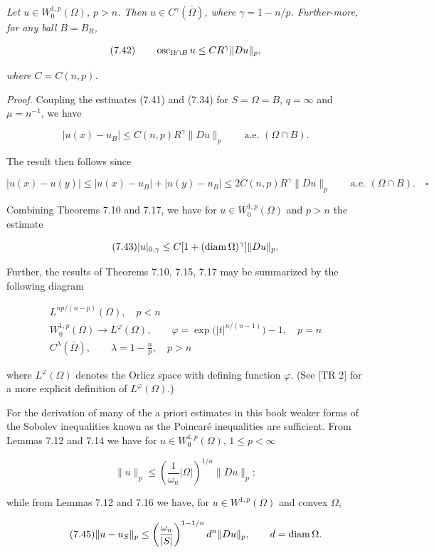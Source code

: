 \begin{theorem}\label{gt:thm-sobolev-morrey}
\emph{Let $u\in W^{1,p}_0(\Omega)$, $p>n$. Then $u\in C^\gamma(\overline{\Omega})$, where $\gamma=1-n/p$. Further-more, for any ball $B=B_R$,}

\[
(7.42)\qquad \operatorname{osc}_{\Omega\cap B} u \le CR^\gamma \|Du\|_p,
\]

\emph{where $C=C(n,p)$.}

\textit{Proof.} Coupling the estimates (7.41) and (7.34) for $S=\Omega=B$, $q=\infty$ and $\mu=n^{-1}$, we have

\[
|u(x)-u_B|\le C(n,p)R^\gamma \|Du\|_p \qquad \text{a.e. }(\Omega\cap B).
\]

The result then follows since

\[
|u(x)-u(y)|\le |u(x)-u_B|+|u(y)-u_B|
\le 2C(n,p)R^\gamma \|Du\|_p \qquad \text{a.e. }(\Omega\cap B). \quad \square
\]



Combining Theorems 7.10 and 7.17, we have for $u\in W_0^{1,p}(\Omega)$ and $p>n$ the estimate

\begin{equation}
\tag{7.43}
|u|_{0,\gamma}\le C[1+(\operatorname{diam} \Omega)^\gamma]\|Du\|_p.
\end{equation}

Further, the results of Theorems 7.10, 7.15, 7.17 may be summarized by the following diagram

\[
\begin{array}{c}
L^{np/(n-p)}(\Omega), \quad p<n \\[1.5ex]
W_0^{1,p}(\Omega)\to L^{\varphi}(\Omega), \qquad \varphi=\exp\!\bigl(|t|^{n/(n-1)}\bigr)-1,\quad p=n \\[1.5ex]
C^{\lambda}(\bar{\Omega}), \qquad \lambda=1-\frac{n}{p},\quad p>n
\end{array}
\]

where $L^{\varphi}(\Omega)$ denotes the Orlicz space with defining function $\varphi$. (See [TR 2] for a more explicit definition of $L^{\varphi}(\Omega)$.)

For the derivation of many of the a priori estimates in this book weaker forms of the Sobolev inequalities known as the Poincar\'e inequalities are sufficient. From Lemmas 7.12 and 7.14 we have for $u\in W_0^{1,p}(\Omega)$, $1\le p<\infty$

\begin{equation}
\tag{7.44}
\|u\|_p\le \left(\frac{1}{\omega_n}|\Omega|\right)^{1/n}\|Du\|_p;
\end{equation}

while from Lemmas 7.12 and 7.16 we have, for $u\in W^{1,p}(\Omega)$ and convex $\Omega$,

\begin{equation}
\tag{7.45}
\|u-u_S\|_p\le \left(\frac{\omega_n}{|S|}\right)^{1-1/n} d^n\|Du\|_p,\qquad d=\operatorname{diam} \Omega.
\end{equation}

\end{theorem}

